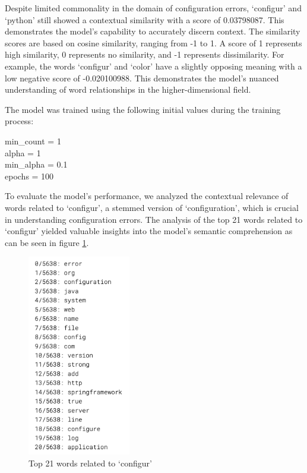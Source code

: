 \documentclass[english,bachelor]{swsLeipzig}
\begin{document}
Despite limited commonality in the domain of configuration errors, `configur' and `python' still showed a contextual similarity with a score of 0.03798087. This demonstrates the model's capability to accurately discern context. The similarity scores are based on cosine similarity, ranging from -1 to 1. A score of 1 represents high similarity, 0 represents no similarity, and -1 represents dissimilarity. For example, the words `configur' and `color' have a slightly opposing meaning with a low negative score of -0.020100988. This demonstrates the model's nuanced understanding of word relationships in the higher-dimensional field.

The model was trained using the following initial values during the training process:\\

\begin{adjustwidth}{1cm}{0cm}
  min\_count = 1\\
  alpha = 1\\
  min\_alpha = 0.1\\
  epochs = 100\\
\end{adjustwidth}

To evaluate the model's performance, we analyzed the contextual relevance of words related to 
`configur', a stemmed version of `configuration', which is crucial in understanding configuration errors. The analysis of the top 21 words related to `configur' yielded valuable insights into the model's semantic comprehension as can be seen in figure \ref{fig:figure52}.

\begin{figure}[h]
  \centering
  \includegraphics[width=0.4\textwidth]{images/ressimilar.png}
  \caption{Top 21 words related to `configur'}
  \label{fig:figure52}
\end{figure}
\end{document}
